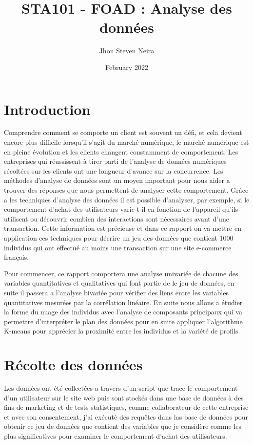 \documentclass[12pt, a4paper]{article}
\title{STA101 - FOAD : Analyse des données}
\author{Jhon Steven Neira}
\date{February 2022}
\begin{document}
  
\maketitle
  
\tableofcontents

\section{Introduction}
   
Comprendre comment se comporte un client est souvent un défi, et cela devient encore plus difficile lorsqu'il s'agit du marché numérique, le marché numérique est en pleine évolution et les clients changent constamment de comportement. Les entreprises qui réussissent à tirer parti de l'analyse de données numériques récoltées sur les clients ont une longueur d'avance sur la concurrence. Les méthodes d’analyse de données sont un moyen important pour nous aider a trouver des réponses que nous permettent de analyser cette comportement. Grâce a les techniques d’analyse des données il est possible d'analyser, par exemple, si le comportement d'achat des utilisateurs varie-t-il en fonction de l'appareil qu'ils utilisent ou découvrir combien des interactions sont nécessaires avant d'une transaction. Cette information est précieuse et dans ce rapport on va mettre en application ces techniques pour décrire un jeu des données que contient 1000 individus  qui ont effectué au moins une transaction sur une site e-commerce français.

Pour commencer, ce rapport comportera une analyse univariée de chacune des variables quantitatives et qualitatives qui font partie de le jeu de données, en suite il passera a l'analyse bivariée pour vérifier des liens entre les variables quantitatives mesurées par la corrélation linéaire. En suite nous allons a étudier la forme du nuage des individus avec l'analyse de composants principaux qui va permettre d'interpréter le plan des données pour en suite appliquer l'algorithme K-means pour apprécier la proximité entre les individus et la variété de profils.


\section{Récolte des  données }
Les données ont été collectées a travers d'un script que trace le comportement d'un utilisateur sur le site web puis sont stockés dans une base de données à des fins de marketing et de tests statistiques, comme collaborateur de cette entreprise et avec son consentement, j'ai exécuté des requêtes dans las base de données pour obtenir ce jeu de données que contient des variables que je considère comme les plus significatives pour examiner le comportement d'achat des utilisateurs.
\end{document}
